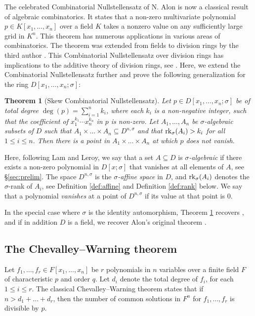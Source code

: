 \documentclass[11pt,reqno]{amsart}
\newtheorem{thm}{Theorem}[section]
\theoremstyle{definition}
\newcommand{\rk}{{\rm rk}}
\begin{document}
The celebrated Combinatorial Nullstellensatz of N. Alon \cite[Theorem 1.2]{Alon99} is now a classical result of algebraic combinatorics. It states that a non-zero multivariate polynomial $p \in K[x_1,\ldots,x_n]$ over a field $K$ takes a nonzero value on any sufficiently large grid in $K^n$. This theorem has numerous applications in various areas of combinatorics. The theorem was extended from fields to division rings by the third author \cite[Theorem 1.1]{Par23}. This Combinatorial Nullstellensatz over division rings has implications to the additive theory of division rings, see \cite[\S3,\S4]{Par23}. Here, we extend the Combinatorial Nullstellensatz further and prove the following generalization for the ring $D[x_1,\ldots,x_n;\sigma]$:

\begin{thm}[Skew Combinatorial Nullstellensatz]\label{comb_null_main} Let $p \in D[x_1,\ldots,x_n;\sigma]$ be of total degree $\deg(p)=\sum_{i=1}^n {k_i}$, where each $k_i$ is a non-negative integer, such that the coefficient of $x_1^{k_1}\cdots x_n^{k_n}$ in $p$ is non-zero. Let $A_1,\ldots,A_n$ be $\sigma$-algebraic subsets of $D$ such that $A_1 \times \dots \times A_n \subseteq D^{n,\sigma}$ and that $\rk_\sigma(A_i) > k_i$ for all $1 \leq i \leq n$. Then there is a point in $A_1 \times \dots \times A_n$ at which $p$ does not vanish. 
\end{thm}

Here, following Lam and Leroy, we say that a set $A \subseteq D$ is {\it $\sigma$-algebraic} if there exists a non-zero polynomial in $D[x;\sigma]$ that vanishes at all elements of $A$, see \S\ref{sec:prelim}. The space $D^{n,\sigma}$ is the \emph{$\sigma$-affine space} in $D$, and $\rk_\sigma(A_i)$ denotes the $\sigma$-rank of $A_i$, see Definition \ref{def:affine} and Definition \ref{def:rank} below. We say that a polynomial {\it vanishes} at a point of $D^{n,\sigma}$ if its value at that point is $0$.

In the special case where $\sigma$ is the identity automorphism, Theorem \ref{comb_null_main} recovers \cite[Theorem 1.1]{Par23}, and if in addition $D$ is a field, we recover Alon's original theorem \cite[Theorem 1.2]{Alon99}.

\subsection{The Chevalley--Warning theorem}

Let $f_1,\ldots,f_r \in F[x_1,\ldots,x_n]$ be $r$ polynomials in $n$ variables over a finite field $F$ of characteristic $p$ and  order $q$. Let $d_i$  denote the total degree of $f_i$, for each $1 \leq i \leq r$. The classical Chevalley--Warning theorem states that if $n > d_1+\dots+d_r$, then the number of common solutions in $F^n$ for $f_1,\ldots,f_r$ is divisible by $p$. 
\end{document}
